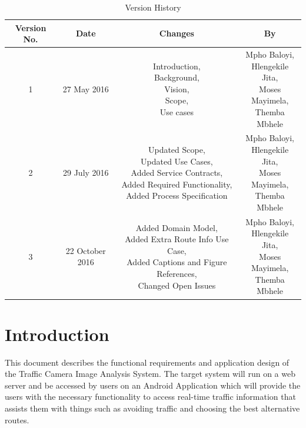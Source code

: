 \documentclass[a4paper,12pt]{article}
\begin{document}
\newpage
\tableofcontents
\newpage

\newpage
\begin{table}[ht]
 \centering
 \caption{Version History}
 \label{tab:table1}
 \begin{tabular}{cccc}
   \toprule Version No. & Date & Changes & By\\
   \midrule 1 & 27 May 2016 & \makecell {Introduction,\\ Background,\\ Vision,\\ Scope,\\ Use cases} & \makecell {Mpho Baloyi,\\ Hlengekile Jita,\\ Moses Mayimela,\\ Themba Mbhele}\\
   2 & 29 July 2016 & \makecell {Updated Scope,\\ Updated Use Cases,\\ Added Service Contracts,\\ Added Required Functionality,\\ Added Process Specification} & \makecell {Mpho Baloyi,\\ Hlengekile Jita,\\ Moses Mayimela,\\ Themba Mbhele} \\
   3 & 22 October 2016 & \makecell {Added Domain Model,\\ Added Extra Route Info Use Case,\\ Added Captions and Figure References,\\ Changed Open Issues} & \makecell {Mpho Baloyi,\\ Hlengekile Jita,\\ Moses Mayimela,\\ Themba Mbhele} \\
   \bottomrule
  \end{tabular}
\end{table}
\newpage

\section{Introduction}
This document describes the functional requirements and application design of the Traffic Camera Image Analysis System. The target system will run on a web server  and be accessed by users on an Android Application which will provide the users with the necessary functionality to access real-time traffic information that assists them with things such as avoiding traffic and choosing the best alternative routes. 
\end{document}
